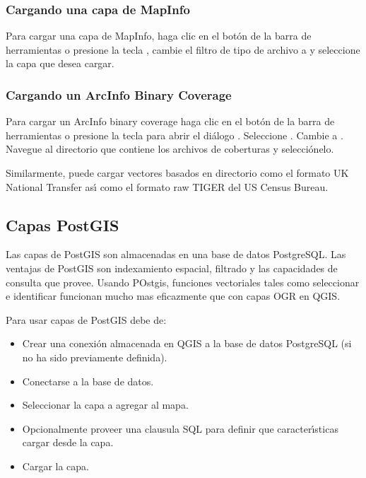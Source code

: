 \subsubsection{Cargando una capa de MapInfo}

Para cargar una capa de MapInfo, haga clic en el bot\'on  
de la barra de herramientas o presione la tecla , cambie el filtro de tipo de archivo a
 y seleccione la capa que desea cargar.

\subsubsection{Cargando un ArcInfo Binary Coverage}

Para cargar un ArcInfo binary coverage haga clic en el bot\'on  
 de la barra de herramientas
o presione la tecla  para abrir el di\'alogo 
.  Seleccione . Cambie a . 
Navegue al directorio que contiene los archivos de coberturas y selecci\'onelo.

Similarmente, puede cargar vectores basados en directorio como el formato UK National Transfer as\'{\i} como el 
formato raw TIGER del US Census Bureau.

\subsection{Capas PostGIS}
\label{label_postgis} 

Las capas de PostGIS son almacenadas en una base de datos PostgreSQL. Las ventajas de PostGIS
son indexamiento espacial, filtrado y las capacidades de consulta que provee. Usando POstgis, funciones
vectoriales tales como seleccionar e identificar funcionan mucho mas eficazmente que con
capas OGR en QGIS.

Para usar capas de PostGIS debe de:
\begin{itemize}
\item Crear una conexi\'on almacenada en QGIS a la base de datos PostgreSQL (si no ha sido
previamente definida).
\item Conectarse a la base de datos.
\item Seleccionar la capa a agregar al mapa.
\item Opcionalmente proveer una clausula SQL 
para definir que caracter\'{\i}sticas cargar desde la capa.
\item Cargar la capa.
\end{itemize}

